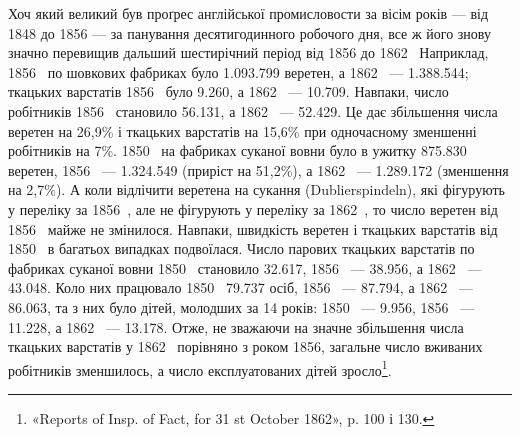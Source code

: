 Хоч який великий був проґрес англійської промисловости
за вісім років — від 1848 до 1856 — за панування десятигодинного
робочого дня, все ж його знову значно перевищив дальший
шестирічний період від 1856 до 1862~ Наприклад, 1856~ по
шовкових фабриках було \num{1.093.799} веретен, а 1862~ — \num{1.388.544};
ткацьких варстатів 1856~ було \num{9.260}, а 1862~ — \num{10.709}. Навпаки,
число робітників 1856~ становило \num{56.131}, а 1862~ — \num{52.429}.
Це дає збільшення числа веретен на 26,9\% і ткацьких варстатів
на 15,6\% при одночасному зменшенні робітників на 7\%. 1850~ на
фабриках суканої вовни було в ужитку \num{875.830} веретен, 1856~ —
\num{1.324.549} (приріст на 51,2\%), а 1862~ — \num{1.289.172} (зменшення
на 2,7\%). А коли відлічити веретена на сукання (Dublierspindeln),
які фігурують у переліку за 1856~, але не фігурують у переліку
за 1862~, то число веретен від 1856~ майже не змінилося. Навпаки,
швидкість веретен і ткацьких варстатів від 1850~ в
багатьох випадках подвоїлася. Число парових ткацьких варстатів
по фабриках суканої вовни 1850~ становило \num{32.617},
1856~ — \num{38.956}, а 1862~ — \num{43.048}. Коло них працювало 1850~
\num{79.737} осіб, 1856~ — \num{87.794}, а 1862~ — \num{86.063}, та з них було
дітей, молодших за 14 років: 1850~ — \num{9.956}, 1856~ — \num{11.228},
а 1862~ — \num{13.178}. Отже, не зважаючи на значне збільшення
числа ткацьких варстатів у 1862~ порівняно з роком 1856, загальне
число вживаних робітників зменшилось, а число експлуатованих
дітей зросло\footnote{
«Reports of Insp. of Fact, for 31 st October 1862», p. 100 і 130.
}.

